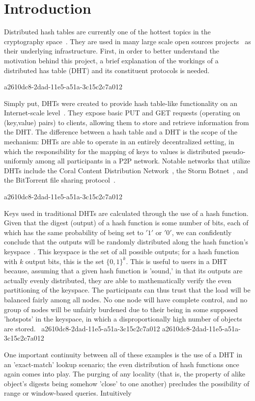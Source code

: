 \documentclass[12pt]{article}
\begin{document}
\section{Introduction}
\par Distributed hash tables are currently one of the hottest topics in the cryptography space~\cite{Stoica:2001dj,Rowstron:2001ea,Ratnasamy:2001wn}. They are used in many large scale open sources projects~\cite{Freitas:2013tb,Xu:2010vs,Perfitt:2010fh} as their underlying infrastructure. First, in order to better understand the motivation behind this project, a brief explanation of the workings of a distributed has table (DHT) and its constituent protocols is needed.

a2610dc8-2dad-11e5-a51a-3c15c2c7a012\par Simply put, DHTs were created to provide hash table-like functionality on an Internet-scale level~\cite{Ratnasamy:2001wn}. They expose basic PUT and GET requests (operating on (key,value) pairs) to clients, allowing them to store and retrieve information from the DHT. The difference between a hash table and a DHT is the scope of the mechanism: DHTs are able to operate in an entirely decentralized setting, in which the responsibility for the mapping of keys to values is distributed pseudo-uniformly among all participants in a P2P network. Notable networks that utilize DHTs include the Coral Content Distribution Network~\cite{Freedman:2004vb}, the Storm Botnet~\cite{Holz:2008uk}, and the BitTorrent file sharing protocol~\cite{Cohen:y1_8mBnw}.

a2610dc8-2dad-11e5-a51a-3c15c2c7a012\par Keys used in traditional DHTs are calculated through the use of a hash function. Given that the digest (output) of a hash function is some number of bits, each of which has the same probability of being set to $'1'$ or $'0'$, we can confidently conclude that the outputs will be randomly distributed along the hash function's keyspace~. This keyspace is the set of all possible outputs; for a hash function with $k$ output bits, this is the set $\{0,1\}^k$. This is useful to users in a DHT because, assuming that a given hash function is 'sound,' in that its outputs are actually evenly distributed, they are able to mathematically verify the even partitioning of the keyspace. The participants can thus trust that the load will be balanced fairly among all nodes. No one node will have complete control, and no group of nodes will be unfairly burdened due to their being in some supposed 'hotspots' in the keyspace, in which a disproportionally high number of objects are stored.~
a2610dc8-2dad-11e5-a51a-3c15c2c7a012
a2610dc8-2dad-11e5-a51a-3c15c2c7a012\par One important continuity between all of these examples is the use of a DHT in an 'exact-match' lookup scenario; the even distribution of hash functions once again comes into play. The purging of any locality (that is, the property of alike object's digests being somehow 'close' to one another) precludes the possibility of range or window-based queries. Intuitively
\end{document}
